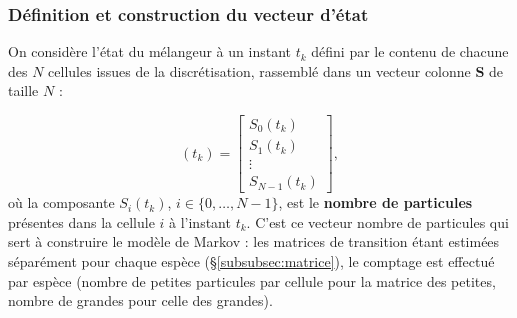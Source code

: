 \documentclass[french]{MemoireMaster}
\begin{document}
\subsubsection{Définition et construction du vecteur d'état}
\label{subsubsec:vecteur_etat}

On considère l'état du mélangeur à un instant $t_k$ défini par le contenu de chacune des $N$ cellules issues de la discrétisation, rassemblé dans un vecteur colonne $\mathbf{S}$ de taille $N$ :

\begin{equation}
  \mathbf{}(t_k)
  =
  \begin{bmatrix}
    S_0(t_k)\\
    S_1(t_k)\\
    \vdots\\
    S_{N-1}(t_k)
  \end{bmatrix},
  \label{eq:vecteur_etat}
\end{equation}
où la composante $S_i(t_k)$, $i \in \{0, \dots, N-1\}$, est le \textbf{nombre de particules} présentes dans la cellule $i$ à l'instant $t_k$. C'est ce vecteur nombre de particules qui sert à construire le modèle de Markov : les matrices de transition étant estimées séparément pour chaque espèce (\S\ref{subsubsec:matrice}), le comptage est effectué par espèce (nombre de petites particules par cellule pour la matrice des petites, nombre de grandes pour celle des grandes).
\end{document}
